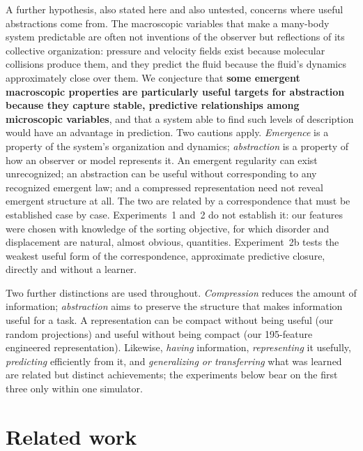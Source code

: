 \documentclass[11pt,a4paper]{article}
\begin{document}
A further hypothesis, also stated here and also untested, concerns where
useful abstractions come from. The macroscopic variables that make a
many-body system predictable are often not inventions of the observer but
reflections of its collective organization: pressure and velocity fields exist
because molecular collisions produce them, and they predict the fluid because
the fluid's dynamics approximately close over them. We conjecture that
\textbf{some emergent macroscopic properties are particularly useful targets
for abstraction because they capture stable, predictive relationships among
microscopic variables}, and that a system able to find such levels of
description would have an advantage in prediction. Two cautions apply.
\emph{Emergence} is a property of the system's organization and dynamics;
\emph{abstraction} is a property of how an observer or model represents it. An
emergent regularity can exist unrecognized; an abstraction can be useful
without corresponding to any recognized emergent law; and a compressed
representation need not reveal emergent structure at all. The two are related
by a correspondence that must be established case by case. Experiments~1
and~2 do not establish it: our features were chosen with knowledge of the
sorting objective, for which disorder and displacement are natural, almost
obvious, quantities. Experiment~2b tests the weakest useful form of the
correspondence, approximate predictive closure, directly and without a
learner.

Two further distinctions are used throughout. \emph{Compression} reduces the
amount of information; \emph{abstraction} aims to preserve the structure that
makes information useful for a task. A representation can be compact without being
useful (our random projections) and useful without being compact (our
195-feature engineered representation). Likewise, \emph{having} information,
\emph{representing} it usefully, \emph{predicting} efficiently from it, and
\emph{generalizing or transferring} what was learned are related but distinct
achievements; the experiments below bear on the first three only within one
simulator.

\section{Related work}
\end{document}

